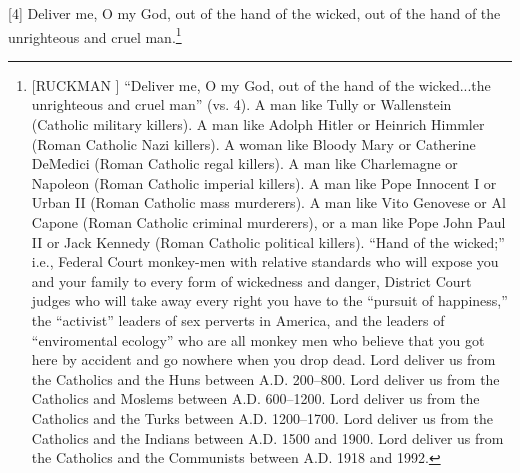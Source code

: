 [4] \textcolor[rgb]{0.00,0.00,1.00}{Deliver me, O my God, out of the hand of the wicked, out of the hand of the unrighteous and cruel man.}\footnote{[RUCKMAN ] ``Deliver me, O my God, out of the hand of the wicked...the unrighteous and cruel man” (vs. 4). A man like Tully or Wallenstein (Catholic military killers). A man like Adolph Hitler or Heinrich Himmler (Roman Catholic Nazi killers). A woman like Bloody Mary or Catherine DeMedici (Roman Catholic regal killers). A man like Charlemagne or Napoleon (Roman Catholic imperial killers). A man like Pope Innocent I or Urban II (Roman Catholic mass murderers). A man like Vito Genovese or Al Capone (Roman Catholic criminal murderers), or a man like Pope John Paul II or Jack Kennedy (Roman Catholic political killers). “Hand of the wicked;” i.e., Federal Court monkey-men with relative standards who will expose you and your family to every form of wickedness and danger, District Court judges who will take away every right you have to the “pursuit of happiness,” the “activist” leaders of sex perverts in America, and the leaders of “enviromental ecology” who are all monkey men who believe that you got here by accident and  go nowhere when you drop dead. Lord deliver us from the Catholics and the Huns between A.D. 200–800. Lord deliver us from the Catholics and Moslems between A.D. 600–1200.  Lord deliver us from the Catholics and the Turks between A.D. 1200–1700. Lord deliver us from the Catholics and the Indians between A.D. 1500 and 1900. Lord deliver us from the Catholics and the Communists between A.D. 1918 and 1992.\cite{Ruckman1992Psalms}}
